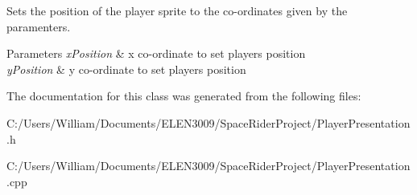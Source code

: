 Sets the position of the player sprite to the co-\/ordinates given by the paramenters. 


\begin{DoxyParams}{Parameters}
{\em x\+Position} & x co-\/ordinate to set players position \\
\hline
{\em y\+Position} & y co-\/ordinate to set players position \\
\hline
\end{DoxyParams}


The documentation for this class was generated from the following files\+:\begin{DoxyCompactItemize}
\item 
C\+:/\+Users/\+William/\+Documents/\+E\+L\+E\+N3009/\+Space\+Rider\+Project/Player\+Presentation.\+h\item 
C\+:/\+Users/\+William/\+Documents/\+E\+L\+E\+N3009/\+Space\+Rider\+Project/Player\+Presentation.\+cpp\end{DoxyCompactItemize}
